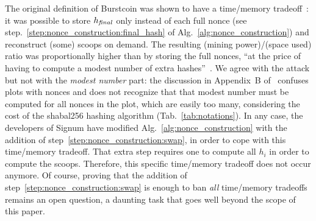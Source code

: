 The original definition of Burstcoin was shown to have a time/memory tradeoff~\cite{ParkKFGAP18}:
it was possible to store ${h_{\mathit{final}}}$ only instead of each full nonce
(see step.~\ref{step:nonce_construction:final_hash} of Alg.~\ref{alg:nonce_construction}) and
reconstruct (some) scoops on demand. The resulting (mining power)/(space used) ratio was proportionally higher
than by storing the full nonces,
``at the price of having to compute a modest number of extra hashes''~\cite{ParkKFGAP18}.
We agree with the attack but not with the \emph{modest number} part: the discussion in Appendix~B
of~\cite{ParkKFGAP18} confuses plots with nonces and does not recognize that that modest number
must be computed for all nonces in the plot, which are easily too many, considering the
cost of the shabal256 hashing algorithm (Tab.~\ref{tab:notations}). In any case, the developers
of Signum have modified Alg.~\ref{alg:nonce_construction} with the addition of
step~\ref{step:nonce_construction:swap}, in order to cope with this time/memory tradeoff.
That extra step requires one to compute all $h_i$ in order to compute the scoops.
Therefore, this specific time/memory tradeoff does not occur anymore. Of course, proving
that the addition of step~\ref{step:nonce_construction:swap} is enough to ban \emph{all}
time/memory tradeoffs remains an open question,
a daunting task that goes well beyond the scope of this paper.

